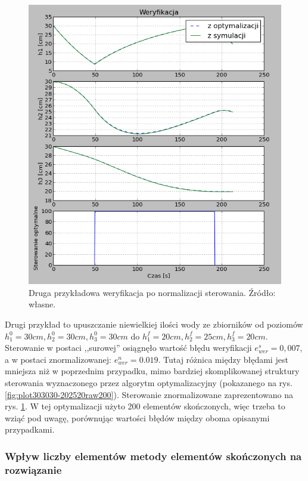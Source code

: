 \begin{figure}[htp]
    \centering
    \includegraphics{Grafika/plot_30_30_30-20_25_20_normalised_200}
    \caption{Druga przykładowa weryfikacja po normalizacji sterowania. Źródło: własne.}
    \label{fig:plot303030-202520normalised200}
\end{figure}

Drugi przykład to upuszczanie niewielkiej ilości wody ze zbiorników od poziomów $h_{1}^{0} = 30 cm, h_{2}^{0} = 30 cm, h_{3}^{0} = 30 cm$ do $h_{1}^{f} = 20 cm, h_{2}^{f} = 25 cm, h_{3}^{f} = 20 cm$. Sterowanie w postaci ,,surowej'' osiągnęło wartość błędu weryfikacji $e_{wer}^{s} = 0,007$, a w postaci znormalizowanej: $e_{wer}^{n} = 0.019$. Tutaj różnica między błędami jest mniejsza niż w poprzednim przypadku, mimo bardziej skomplikowanej struktury sterowania wyznaczonego przez algorytm optymalizacyjny (pokazanego na rys. \ref{fig:plot303030-202520raw200}). Sterowanie znormalizowane zaprezentowano na rys. \ref{fig:plot303030-202520normalised200}. W tej optymalizacji użyto 200 elementów skończonych, więc trzeba to wziąć pod uwagę, porównując wartości błędów między oboma opisanymi przypadkami.


\subsubsection{Wpływ liczby elementów metody elementów skończonych na rozwiązanie}

